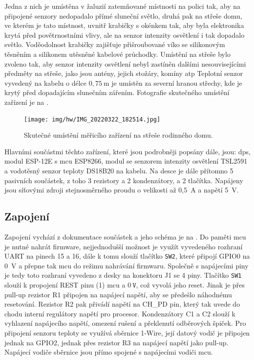     Jedna z nich je umístěna v žaluzií zatemňované místnosti na polici tak, aby na připojené senzory nedopadalo přímé sluneční světlo, druhá pak na střeše domu, ve kterém je tato místnost, uvnitř krabičky s okénkem tak, aby byla elektronika krytá před povětrnostními vlivy, ale na senzor intenzity osvětlení i tak dopadalo světlo. Voděodolnost krabičky zajišťuje přišroubované víko se silikonovým těsněním a silikonem utěsněné kabelové průchodky. Umístění na střeše bylo zvoleno tak, aby senzor intenzity osvětlení nebyl zastíněn dalšími nesouvisejícími předměty na střeše, jako jsou antény, jejich stožáry, komíny \acrshort{atp} Teplotní senzor vyvedený na kabelu o délce $0{,}75~\textrm{m}$ je umístěn za severní hranou střechy, kde je krytý před dopadajícím slunečním zářením. Fotografie skutečného umístění zařízení je na .
    \begin{figure}
        \centering
        \texttt{[image: img/hw/IMG\_20220322\_182514.jpg]}
        \caption[Skutečné umístění měřicího zařízení]{Skutečné umístění měřicího zařízení na střeše rodinného domu.}
        \label{fig:senzor}
    \end{figure}
    
    Hlavními součástmi těchto zařízení, které jsou podrobněji popsány dále, jsou: \acrshort{dps}, modul ESP-12E s \acrshort{mcu} ESP8266, modul se senzorem intenzity osvětlení TSL2591 a vodotěsný senzor teploty DS18B20 na kabelu. Na desce je dále přítomno 5 pasivních součástek, z toho 3 rezistory a 2 kondenzátory, a 2 tlačítka. Napájeny jsou síťovými zdroji stejnosměrného proudu o velikosti až 0{,}5~A a napětí 5~V.
    \subsection{Zapojení}
        Zapojení vychází z dokumentace součástek a jeho schéma je na . Do paměti \acrshort{mcu} je nutné nahrát firmware, nejjednodušší možnost je využít vyvedeného rozhraní UART na pinech 15 a 16, dále k tomu slouží tlačítko \texttt{SW2}, které připojí GPIO0 na 0~V a přepne tak \acrshort{mcu} do režimu nahrávání firmwaru. Společně s napájecími piny je tedy toto rozhraní vyvedeno z desky na konektoru J1 se 4 piny. Tlačítko \texttt{SW1} slouží k propojení REST pinu (1) \acrshort{mcu} a $0~\texttt{V}$, což vyvolá jeho reset. Jinak je přes pull-up rezistor R1 připojen na napájecí napětí, aby se předešlo náhodnému resetování. Rezistor R2 pak přivádí napětí na CH\_PD pin, který tak uvede do chodu interní regulátory napětí pro procesor. Kondenzátory C1 a C2 slouží k vyhlazení napájecího napětí, omezení rušení a překlenutí odběrových špiček. Pro připojení senzoru teploty se využívá sběrnice 1-Wire, její datový vodič je připojen jednak na GPIO2, jednak přes rezistor R3 na napájecí napětí jako pull-up. Napájecí vodiče sběrnice jsou přímo spojené s napájecími vodiči \acrshort{mcu}.

